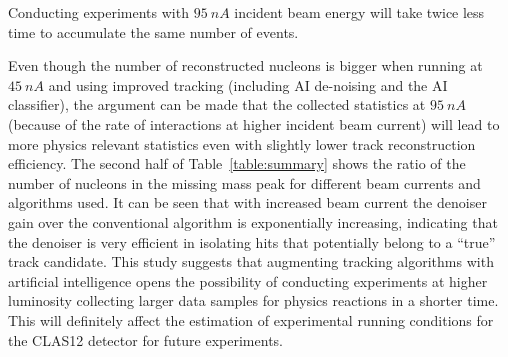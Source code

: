 Conducting experiments with $95~nA$ incident beam energy will take twice less time to accumulate the same number of events.

Even though the number of reconstructed nucleons is bigger when running at $45~nA$ and using improved 
tracking (including AI de-noising and the AI classifier), the argument can be made that the collected statistics at 
$95~nA$ (because of the rate of interactions at higher incident beam current) will lead to more physics relevant
statistics even with slightly lower track reconstruction efficiency.
The second half of Table~\ref{table:summary} shows the ratio of the number of nucleons in the 
missing mass peak for different beam currents and algorithms used. It can be seen that with increased 
beam current the denoiser gain over the conventional algorithm is exponentially increasing, indicating that 
the denoiser is very efficient in isolating hits that potentially belong to a ``true'' track candidate.
This study suggests that augmenting tracking algorithms with artificial intelligence opens the possibility
of conducting experiments at higher luminosity collecting larger data samples for physics reactions in 
a shorter time. This will definitely affect the estimation of experimental running conditions for the CLAS12 
detector for future experiments.
